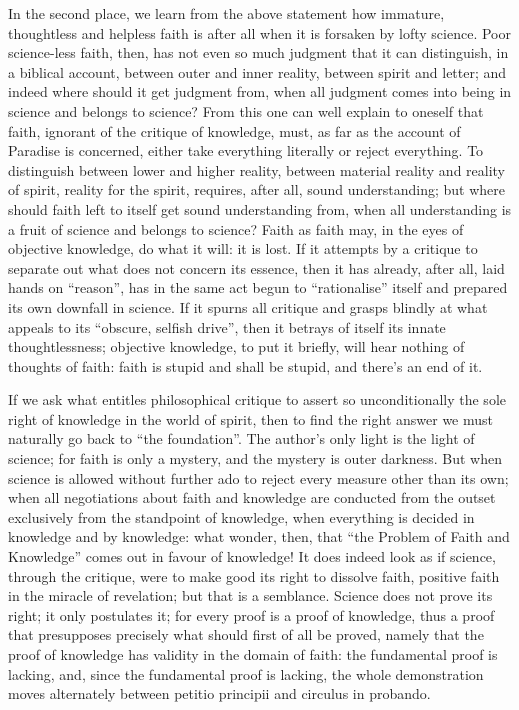 \documentclass[12pt]{book}
\newcommand{\opage}[1]{\marginnote{\footnotesize\textit{[#1]}}}
\begin{document}
In the second place, we learn from the above statement how immature,
thoughtless and helpless faith is after all when it is forsaken by lofty
science. Poor science-less faith, then, has not even so much judgment that
it can distinguish, in a biblical account, between outer and inner reality,
between spirit and letter; and indeed where should it get judgment from,
when all judgment comes into being in science and belongs to science? From
this one can well explain to oneself that faith, ignorant of the critique of
knowledge, must, as far as the account of Paradise is concerned, either take
everything literally or reject everything. To distinguish between lower and
higher reality, between material reality and reality of spirit, reality for
the spirit, requires, after all, sound understanding; but where should faith
left to itself get sound understanding from, when all understanding is a
fruit of science and belongs to science? Faith as faith may, in the eyes of
objective knowledge, do what it will: it is lost. If it attempts by a
critique to separate out what does not concern its essence, then it has
already, after all, laid hands on ``reason'', has in the same act begun to
``rationalise'' itself and prepared its own downfall in science. If it
spurns all critique and grasps blindly at what appeals to its ``obscure,
selfish drive'', then it betrays of itself its innate thoughtlessness;
objective knowledge, to put it briefly, will hear nothing of thoughts of
faith: faith is stupid and shall be stupid, and there's an end of it.

If we ask what entitles philosophical critique to assert so unconditionally
the sole right of knowledge in the world of spirit, then to find the right
answer we must naturally go back to ``the foundation''. The author's
\opage{8}\setcounter{footnote}{0}%
only light is the light of science; for faith is only a mystery, and the
mystery is outer darkness. But when science is allowed without further ado
to reject every measure other than its own; when all negotiations about
faith and knowledge are conducted from the outset exclusively from the
standpoint of knowledge, when everything is decided in knowledge and by
knowledge: what wonder, then, that ``the Problem of Faith and Knowledge''
comes out in favour of knowledge! It does indeed look as if science, through
the critique, were to make good its right to dissolve faith, positive faith
in the miracle of revelation; but that is a semblance. Science does not
prove its right; it only postulates it; for every proof is a proof of
knowledge, thus a proof that presupposes precisely what should first of all
be proved, namely that the proof of knowledge has validity in the domain of
faith: the fundamental proof is lacking, and, since the fundamental proof is
lacking, the whole demonstration moves alternately between petitio principii
and circulus in probando.
\end{document}

